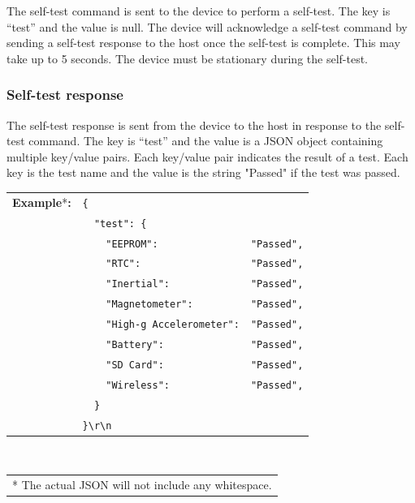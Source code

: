 The self-test command is sent to the device to perform a self-test.  The key is \enquote{test} and the value is null.  The device will acknowledge a self-test command by sending a self-test response to the host once the self-test is complete.  This may take up to 5 seconds.  The device must be stationary during the self-test.


\subsubsection{Self-test response}

The self-test response is sent from the device to the host in response to the self-test command.  The key is \enquote{test} and the value is a \ac{JSON} object containing multiple key/value pairs.  Each key/value pair indicates the result of a test.  Each key is the test name and the value is the string "Passed" if the test was passed.

\begin{table}[H]
    \begin{tabular}{l l l}
        \textbf{Example}*\textbf{:} & \texttt{\{}\\
        & \texttt{~~"test":~\{} &\\
        & \texttt{~~~~"EEPROM":} & \texttt{"Passed",}\\
        & \texttt{~~~~"RTC":} & \texttt{"Passed",}\\
        & \texttt{~~~~"Inertial":} & \texttt{"Passed",}\\
        & \texttt{~~~~"Magnetometer":} & \texttt{"Passed",}\\
        & \texttt{~~~~"High-g Accelerometer":} & \texttt{"Passed",}\\
        & \texttt{~~~~"Battery":} & \texttt{"Passed",}\\
        & \texttt{~~~~"SD Card":} & \texttt{"Passed",}\\
        & \texttt{~~~~"Wireless":} & \texttt{"Passed",}\\
        & \texttt{~~\}}\\
        & \texttt{\}\textbackslash r\textbackslash n}\\
    \end{tabular}\\
    \begin{tabular}{l}
        \\
        \footnotesize{* The actual \acs{JSON} will not include any whitespace.}
    \end{tabular}
\end{table}

